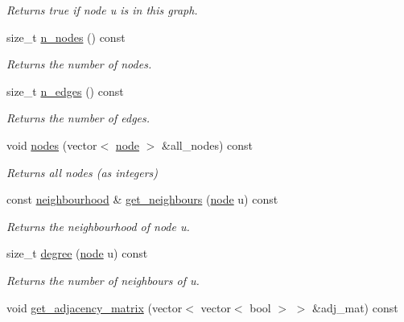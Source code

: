 \begin{DoxyCompactItemize}
\begin{DoxyCompactList}\small\item\em Returns true if node {\itshape u} is in this graph. \end{DoxyCompactList}\item 
size\+\_\+t \hyperlink{classlgraph_1_1utils_1_1xxgraph_ad345f1fbf1dee34e1579b5aea9aef9b2}{n\+\_\+nodes} () const 
\begin{DoxyCompactList}\small\item\em Returns the number of nodes. \end{DoxyCompactList}\item 
size\+\_\+t \hyperlink{classlgraph_1_1utils_1_1xxgraph_af3f7c3835406c2cbf70479ae1c0253c9}{n\+\_\+edges} () const 
\begin{DoxyCompactList}\small\item\em Returns the number of edges. \end{DoxyCompactList}\item 
void \hyperlink{classlgraph_1_1utils_1_1xxgraph_a99f83387aa9f59b861e675251be5a3ad}{nodes} (vector$<$ \hyperlink{namespacelgraph_1_1utils_a7bd66ede3805ef121bc2835bd48de0cf}{node} $>$ \&all\+\_\+nodes) const \hypertarget{classlgraph_1_1utils_1_1xxgraph_a99f83387aa9f59b861e675251be5a3ad}{}\label{classlgraph_1_1utils_1_1xxgraph_a99f83387aa9f59b861e675251be5a3ad}

\begin{DoxyCompactList}\small\item\em Returns all nodes (as integers) \end{DoxyCompactList}\item 
const \hyperlink{namespacelgraph_1_1utils_a0f2ef47028a466d26841709e705390ac}{neighbourhood} \& \hyperlink{classlgraph_1_1utils_1_1xxgraph_a2c5332c4663c2d52828893f095a68202}{get\+\_\+neighbours} (\hyperlink{namespacelgraph_1_1utils_a7bd66ede3805ef121bc2835bd48de0cf}{node} u) const 
\begin{DoxyCompactList}\small\item\em Returns the neighbourhood of node u. \end{DoxyCompactList}\item 
size\+\_\+t \hyperlink{classlgraph_1_1utils_1_1xxgraph_af588aa4c68004a31aa143024cdb6dcc9}{degree} (\hyperlink{namespacelgraph_1_1utils_a7bd66ede3805ef121bc2835bd48de0cf}{node} u) const 
\begin{DoxyCompactList}\small\item\em Returns the number of neighbours of u. \end{DoxyCompactList}\item 
void \hyperlink{classlgraph_1_1utils_1_1xxgraph_a401454762f6b4b69f13ab0a10729c457}{get\+\_\+adjacency\+\_\+matrix} (vector$<$ vector$<$ bool $>$ $>$ \&adj\+\_\+mat) const \hypertarget{classlgraph_1_1utils_1_1xxgraph_a401454762f6b4b69f13ab0a10729c457}{}\label{classlgraph_1_1utils_1_1xxgraph_a401454762f6b4b69f13ab0a10729c457}


\end{DoxyCompactItemize}
